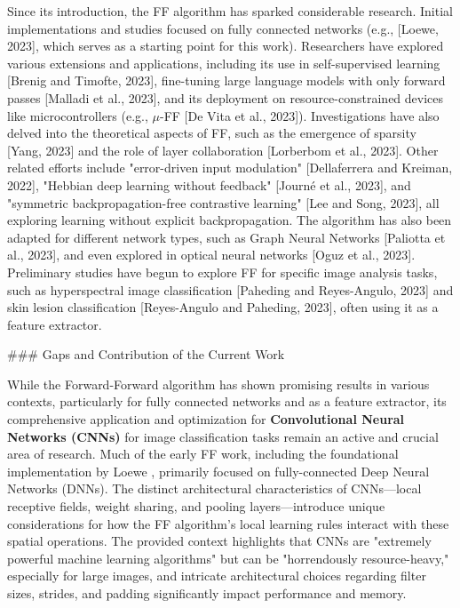 \documentclass{article}
\begin{document}
Since its introduction, the FF algorithm has sparked considerable research. Initial implementations and studies focused on fully connected networks (e.g., [Loewe, 2023], which serves as a starting point for this work). Researchers have explored various extensions and applications, including its use in self-supervised learning [Brenig and Timofte, 2023], fine-tuning large language models with only forward passes [Malladi et al., 2023], and its deployment on resource-constrained devices like microcontrollers (e.g., $\mu$-FF [De Vita et al., 2023]). Investigations have also delved into the theoretical aspects of FF, such as the emergence of sparsity [Yang, 2023] and the role of layer collaboration [Lorberbom et al., 2023]. Other related efforts include "error-driven input modulation" [Dellaferrera and Kreiman, 2022], "Hebbian deep learning without feedback" [Journé et al., 2023], and "symmetric backpropagation-free contrastive learning" [Lee and Song, 2023], all exploring learning without explicit backpropagation. The algorithm has also been adapted for different network types, such as Graph Neural Networks [Paliotta et al., 2023], and even explored in optical neural networks [Oguz et al., 2023]. Preliminary studies have begun to explore FF for specific image analysis tasks, such as hyperspectral image classification [Paheding and Reyes-Angulo, 2023] and skin lesion classification [Reyes-Angulo and Paheding, 2023], often using it as a feature extractor.

\#\#\# Gaps and Contribution of the Current Work

While the Forward-Forward algorithm has shown promising results in various contexts, particularly for fully connected networks and as a feature extractor, its comprehensive application and optimization for \textbf{Convolutional Neural Networks (CNNs)} for image classification tasks remain an active and crucial area of research. Much of the early FF work, including the foundational implementation by Loewe \cite{2023}, primarily focused on fully-connected Deep Neural Networks (DNNs). The distinct architectural characteristics of CNNs—local receptive fields, weight sharing, and pooling layers—introduce unique considerations for how the FF algorithm's local learning rules interact with these spatial operations. The provided context highlights that CNNs are "extremely powerful machine learning algorithms" but can be "horrendously resource-heavy," especially for large images, and intricate architectural choices regarding filter sizes, strides, and padding significantly impact performance and memory.
\end{document}
